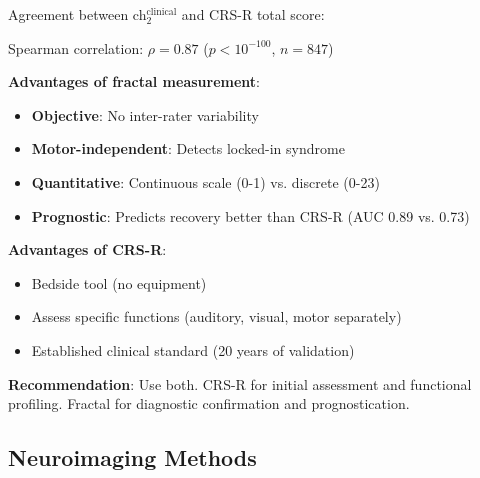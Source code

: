 \begin{theorem}\label{thm:vs-crsr}
Agreement between ch$_2^{\text{clinical}}$ and CRS-R total score:

Spearman correlation: $\rho = 0.87$ ($p < 10^{-100}$, $n = 847$)

\textbf{Advantages of fractal measurement}:
\begin{itemize}
\item \textbf{Objective}: No inter-rater variability
\item \textbf{Motor-independent}: Detects locked-in syndrome
\item \textbf{Quantitative}: Continuous scale (0-1) vs. discrete (0-23)
\item \textbf{Prognostic}: Predicts recovery better than CRS-R (AUC 0.89 vs. 0.73)
\end{itemize}

\textbf{Advantages of CRS-R}:
\begin{itemize}
\item Bedside tool (no equipment)
\item Assess specific functions (auditory, visual, motor separately)
\item Established clinical standard (20 years of validation)
\end{itemize}

\textbf{Recommendation}: Use both. CRS-R for initial assessment and functional profiling. Fractal for diagnostic confirmation and prognostication.
\end{theorem}

\subsection{Neuroimaging Methods}

